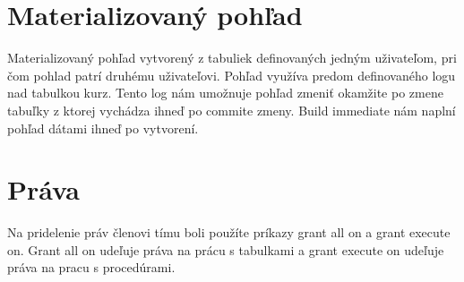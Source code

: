 \documentclass[11pt]{article}
\begin{document}
\section{Materializovaný pohľad}
Materializovaný pohľad vytvorený z tabuliek definovaných jedným uživateľom, pri čom pohlad patrí druhému uživateľovi.
Pohľad využíva predom definovaného logu nad tabulkou kurz. Tento log nám umožnuje pohľad zmeniť okamžite po zmene tabuľky
z ktorej vychádza ihneď po commite zmeny. Build immediate nám naplní pohľad dátami ihneď po vytvorení.


\section{Práva}
Na pridelenie práv členovi tímu boli použíte príkazy grant all on a grant execute on.
Grant all on udeľuje práva na prácu s tabulkami a grant execute on udeľuje práva na pracu s procedúrami.
\end{document}

